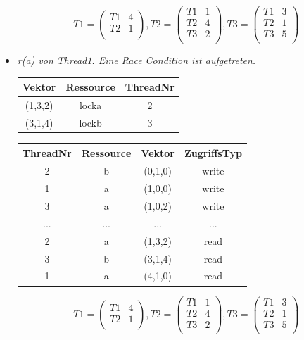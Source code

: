 \documentclass[10pt,a4paper]{article}
\begin{document}
\begin{flushleft}
\begin{itemize}
\begin{tabular}{ >{\small}c >{\small}c >{\small}c >{\small}c }
\end{tabular}
\[
	T1 = \begin{pmatrix}
		T1 & 4\\
		T2 & 1\\
	\end{pmatrix}
	, T2 = \begin{pmatrix}
		T1 & 1\\		
		T2 & 4\\
		T3 & 2\\
	\end{pmatrix}
	, T3 = \begin{pmatrix}
		T1 & 3\\
		T2 & 1\\		
		T3 & 5\\
	\end{pmatrix}
\]
\item \textit{r(a) von Thread1. Eine Race Condition ist aufgetreten.}\\[0.2cm]
\begin{tabular}{ >{\small}c >{\small}c >{\small}c }
  	Vektor & Ressource & ThreadNr \\\hline
  	(1,3,2) & locka & 2 \\
  	(3,1,4) & lockb & 3 \\\hline
\end{tabular}\hspace*{0.5cm}
\begin{tabular}{ >{\small}c >{\small}c >{\small}c >{\small}c }
  	ThreadNr & Ressource & Vektor & ZugriffsTyp \\\hline
  	2 & b & (0,1,0) & write \\
  	1 & a & (1,0,0) & write \\
  	\color{red}3 & \color{red}a & \color{red}(1,0,2) & \color{red}write \\
  	... & ... & ... & ... \\
  	2 & a & (1,3,2) & read \\
  	3 & b & (3,1,4) & read \\
  	\color{red}1 & \color{red}a & \color{red}(4,1,0) & \color{red}read \\\hline
\end{tabular}
\[
	T1 = \begin{pmatrix}
		T1 & 4\\
		T2 & 1\\
	\end{pmatrix}
	, T2 = \begin{pmatrix}
		T1 & 1\\		
		T2 & 4\\
		T3 & 2\\
	\end{pmatrix}
	, T3 = \begin{pmatrix}
		T1 & 3\\
		T2 & 1\\		
		T3 & 5\\
	\end{pmatrix}
\]
\end{itemize}
\end{flushleft}
\newpage
\end{document}
